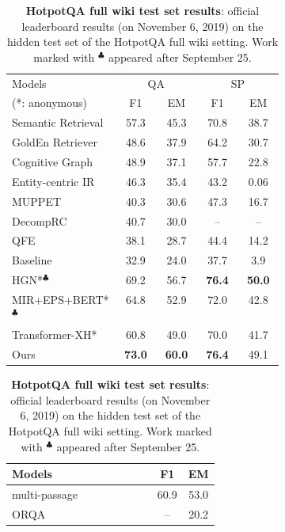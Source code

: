 \begin{table}[!t] %
\hspace{-0.35cm}
\begin{minipage}[t]{0.50\linewidth}
    \centering
    \small{
\vspace{-0.1cm}
\begin{tabular}{ p{0.40\linewidth} | c c | cc  }\toprule 
  Models &\multicolumn{2}{c}{QA} & \multicolumn{2}{c}{SP}  \\
  (*: anonymous) & F1 & EM & F1 & EM \\
  \midrule
Semantic Retrieval & 57.3 & 45.3 & 70.8 & 38.7\\  
GoldEn Retriever & 48.6 & 37.9 & 64.2 & 30.7\\
Cognitive Graph  & 48.9 & 37.1 &57.7  & 22.8\\
Entity-centric IR &46.3 & 35.4 & 43.2 & 0.06\\
MUPPET  & 40.3 & 30.6  &47.3 & 16.7\\
DecompRC  & 40.7 & 30.0 & -- & -- \\
QFE & 38.1 & 28.7  &44.4 & 14.2\\ 
Baseline & 32.9 &  24.0 & 37.7& 3.9\\  \hdashline
HGN*$^\clubsuit$ & 69.2 & 56.7 & \bf 76.4 & \bf 50.0 \\
MIR+EPS+BERT*$^\clubsuit$ & 64.8 & 52.9 & 72.0 & 42.8\\
Transformer-XH* & 60.8 & 49.0 & 70.0 & 41.7\\
\hline
  Ours & \bf 73.0 & \bf 60.0 & \bf 76.4	& 49.1\\
\bottomrule
\end{tabular}
    \caption{{\bf HotpotQA full wiki test set results}: official leaderboard results (on November 6, 2019) on the hidden test set of the HotpotQA full wiki setting. Work marked with $^\clubsuit$ appeared after September 25.}\label{table:test_results_hotpot_qa}
    }
\end{minipage}
\hspace{0.2cm}
\begin{minipage}[t]{.5\linewidth} %
\vspace{-0.1cm}
    \centering
    \small{
\begin{tabular}{ p{0.7\linewidth} | c c }\toprule 
 Models  & F1 & EM  \\
  \midrule
multi-passage ~\citep{multipassage-bert-2019} & 60.9 & 53.0 \\
ORQA~\citep{lee-chang-toutanova:2019:ACL2019} & --  & 20.2  \\

\end{tabular}}
\end{minipage}
\end{table}

